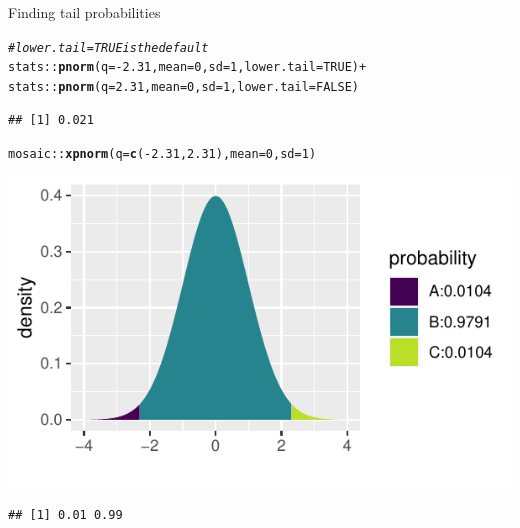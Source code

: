 \documentclass[10pt,handout]{beamer}\usepackage[]{graphicx}\usepackage[]{color}
\makeatletter
\newcommand{\hlnum}[1]{\textcolor[rgb]{0.686,0.059,0.569}{#1}}%
\newcommand{\hlcom}[1]{\textcolor[rgb]{0.678,0.584,0.686}{\textit{#1}}}%
\newcommand{\hlopt}[1]{\textcolor[rgb]{0,0,0}{#1}}%
\newcommand{\hlstd}[1]{\textcolor[rgb]{0.345,0.345,0.345}{#1}}%
\newcommand{\hlkwc}[1]{\textcolor[rgb]{0.333,0.667,0.333}{#1}}%
\newcommand{\hlkwd}[1]{\textcolor[rgb]{0.737,0.353,0.396}{\textbf{#1}}}%
\newenvironment{kframe}{%
 \def\at@end@of@kframe{}%
 \ifinner\ifhmode%
  \def\at@end@of@kframe{\end{minipage}}%
  \begin{minipage}{\columnwidth}%
 \fi\fi%
 \def\FrameCommand##1{\hskip\@totalleftmargin \hskip-\fboxsep
 \colorbox{shadecolor}{##1}\hskip-\fboxsep
     \hskip-\linewidth \hskip-\@totalleftmargin \hskip\columnwidth}%
 \MakeFramed {\advance\hsize-\width
   \@totalleftmargin\z@ \linewidth\hsize
   \@setminipage}}%
 {\par\unskip\endMakeFramed%
 \at@end@of@kframe}
\newenvironment{knitrout}{}{} %
\makeatother
\begin{document}
\begin{frame}[fragile]{Finding tail probabilities}
	
	
	
\begin{knitrout}\tiny
{}\color{fgcolor}\begin{kframe}
\begin{alltt}
\hlcom{# lower.tail = TRUE is the default}
\hlstd{stats}\hlopt{::}\hlkwd{pnorm}\hlstd{(}\hlkwc{q} \hlstd{=} \hlopt{-}\hlnum{2.31}\hlstd{,} \hlkwc{mean} \hlstd{=} \hlnum{0}\hlstd{,} \hlkwc{sd} \hlstd{=} \hlnum{1}\hlstd{,} \hlkwc{lower.tail} \hlstd{=} \hlnum{TRUE}\hlstd{)} \hlopt{+}
\hlstd{stats}\hlopt{::}\hlkwd{pnorm}\hlstd{(}\hlkwc{q} \hlstd{=} \hlnum{2.31}\hlstd{,} \hlkwc{mean} \hlstd{=} \hlnum{0}\hlstd{,} \hlkwc{sd} \hlstd{=} \hlnum{1}\hlstd{,} \hlkwc{lower.tail} \hlstd{=} \hlnum{FALSE}\hlstd{)}
\end{alltt}
\begin{verbatim}
## [1] 0.021
\end{verbatim}
\end{kframe}
\end{knitrout}
	
	\pause 
	
\begin{knitrout}\tiny
{}\color{fgcolor}\begin{kframe}
\begin{alltt}
\hlstd{mosaic}\hlopt{::}\hlkwd{xpnorm}\hlstd{(}\hlkwc{q} \hlstd{=} \hlkwd{c}\hlstd{(}\hlopt{-}\hlnum{2.31}\hlstd{,}\hlnum{2.31}\hlstd{),} \hlkwc{mean} \hlstd{=} \hlnum{0}\hlstd{,} \hlkwc{sd} \hlstd{=} \hlnum{1}\hlstd{)}
\end{alltt}
\end{kframe}

{\centering \includegraphics[width=0.6\linewidth]{figure/probs7-1} 

}


\begin{kframe}\begin{verbatim}
## [1] 0.01 0.99
\end{verbatim}
\end{kframe}
\end{knitrout}
	
	
\end{frame}
\end{document}
